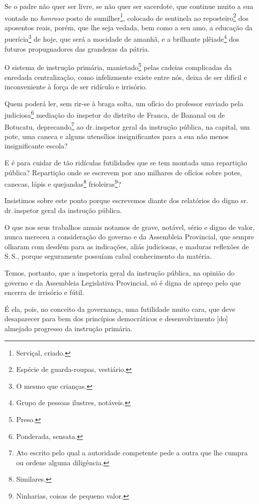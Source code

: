 Se o padre não quer ser livre, se não quer ser sacerdote, que continue
muito a sua vontade no \emph{honroso} posto de sumilher\footnote{
  Serviçal, criado.}, colocado de sentinela ao reposteiro\footnote{
  Espécie de guarda-roupas, vestiário.} dos aposentos reais, porém, que
lhe seja vedada, bem como a seu amo, a educação da puerícia\footnote{O
  mesmo que crianças.} de hoje, que será a mocidade de amanhã, e a
brilhante plêiade\footnote{Grupo de pessoas ilustres, notáveis.} dos
futuros propugnadores das grandezas da pátria.

O sistema de instrução primária, manietado\footnote{Preso.} pelas
cadeias complicadas da enredada centralização, como infelizmente existe
entre nós, deixa de ser difícil e inconveniente à força de ser ridículo
e irrisório.

Quem poderá ler, sem rir-se à braga solta, um ofício do professor
enviado pela judiciosa\footnote{Ponderada, sensata.} mediação do
inspetor do distrito de Franca, de Bananal ou de Botucatu,
deprecando\footnote{Ato escrito pelo qual a autoridade competente pede
  a outra que lhe cumpra ou ordene alguma diligência.} ao dr.\,inspetor
geral da instrução pública, na capital, um pote, uma caneca e alguns
utensílios insignificantes para a sua não menos insignificante escola?

E é para cuidar de tão ridículas futilidades que se tem montada uma
repartição pública? Repartição onde se escrevem por ano milhares de
ofícios sobre potes, canecas, lápis e quejandas\footnote{Similares.}
frioleiras\footnote{Ninharias, coisas de pequeno valor.}?

Insistimos sobre este ponto porque escrevemos diante dos relatórios do
digno sr.\,dr.\,inspetor geral da instrução pública.

O que nos seus trabalhos anuais notamos de grave, notável, sério e digno
de valor, nunca mereceu a consideração do governo e da Assembleia
Provincial, que sempre olharam com desdém para as indicações, aliás
judiciosas, e maduras reflexões de S.\,S., porque seguramente possuíam
cabal conhecimento da matéria.

Temos, portanto, que a inspetoria geral da instrução pública, na opinião
do governo e da Assembleia Legislativa Provincial, só é digna de apreço
pelo que encerra de irrisório e fútil.

É ela, pois, no conceito da governança, uma futilidade muito cara, que
deve desaparecer para bem dos princípios democráticos e desenvolvimento
{[}do{]} almejado progresso da instrução primária.

